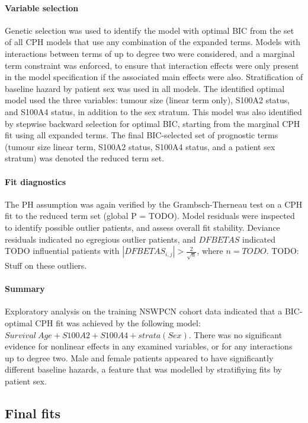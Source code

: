 \documentclass[dissertation.tex]{subfiles}
\begin{document}
\paragraph{Variable selection}
Genetic selection was used to identify the model with optimal \gls{BIC} from the set of all \gls{CPH} models that use any combination of the expanded terms.  Models with interactions between terms of up to degree two were considered, and a marginal term constraint was enforced, to ensure that interaction effects were only present in the model specification if the associated main effects were also.  Stratification of baseline hazard by patient sex was used in all models.  The identified optimal model used the three variables: tumour size (linear term only), S100A2 status, and S100A4 status, in addition to the sex stratum.  This model was also identified by stepwise backward selection for optimal BIC, starting from the marginal \gls{CPH} fit using all expanded terms.  The final \gls{BIC}-selected set of prognostic terms (tumour size linear term, S100A2 status, S100A4 status, and a patient sex stratum) was denoted the reduced term set.

\paragraph{Fit diagnostics}
The \gls{PH} assumption was again verified by the Grambsch-Therneau test on a \gls{CPH} fit to the reduced term set (global P = TODO).  Model residuals were inspected to identify possible outlier patients, and assess overall fit stability.  Deviance residuals indicated no egregious outlier patients, and $DFBETAS$ indicated TODO influential patients with $|DFBETAS_{i,j}| > \frac{2}{\sqrt{n}}$, where $n = TODO$.  TODO: Stuff on these outliers.

\paragraph{Summary}
Exploratory analysis on the training \gls{NSWPCN} cohort data indicated that a BIC-optimal \gls{CPH} fit was achieved by the following model: $Survival ~ Age + S100A2 + S100A4 + strata(Sex)$.  There was no significant evidence for nonlinear effects in any examined variables, or for any interactions up to degree two.  Male and female patients appeared to have significantly different baseline hazards, a feature that was modelled by stratifiying fits by patient sex.

\subsection{Final fits}
\end{document}
